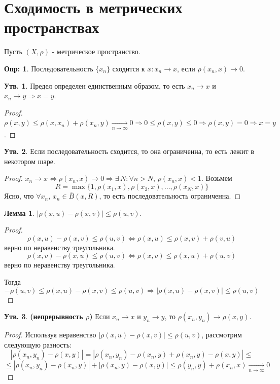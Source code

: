 \documentclass[12pt]{article}
\newcommand{\RN}[1]{%
	\textup{\uppercase\expandafter{\romannumeral#1}}%
}
\theoremstyle{definition}
\newtheorem{defn}{Опр:}
\newtheorem{prop}{Утв.}
\newtheorem{lemma}{Лемма}
\begin{document}
\lhead{Математический анализ - \RN{2}}

\section*{Сходимость в метрических пространствах}
Пусть $(X, \rho)$ - метрическое пространство.
\begin{defn}
	Последовательность $\{x_n\}$ сходится к $x\colon x_n \to x$, если $\rho(x_n,x) \to 0$.
\end{defn}

\begin{prop}
	Предел определен единственным образом, то есть $x_n \to x$ и $x_n \to y \Rightarrow x = y$.
\end{prop}
\begin{proof}
	$\rho(x,y) \leq \rho(x,x_n) + \rho(x_n, y) \xrightarrow[n \to \infty]{} 0  \Rightarrow 0 \leq \rho(x,y) \leq 0 \Rightarrow \rho(x,y) = 0 \Rightarrow x = y$.
\end{proof}

\begin{prop}
	Если последовательность сходится, то она ограниченна, то есть лежит в некотором шаре.
\end{prop}
\begin{proof}
	$x_n \to x \Leftrightarrow \rho(x_n,x) \to 0 \Rightarrow \exists \, N \colon \forall n > N, \, \rho(x_n,x) < 1$. Возьмем 
	$$R = \max\{1, \rho(x_1, x),\rho(x_2,x), \dotsc ,\rho(x_N, x) \}$$
	Ясно, что $\forall x_n, \, x_n \in \overline{B}(x,R)$, то есть последовательность ограниченна.
\end{proof}

\begin{lemma}
	$|\rho(x,u) - \rho(x,v)| \leq \rho(u,v)$.
\end{lemma}
\begin{proof}
	$$\rho(x,u) - \rho(x,v) \leq \rho(u,v) \Leftrightarrow \rho(x,u) \leq \rho(x,v) + \rho(v,u)$$
	верно по неравенству треугольника.
	$$\rho(x,v) - \rho(x,u) \leq \rho(u,v) \Leftrightarrow \rho(x,v) \leq \rho(x,u) + \rho(u,v)$$
	верно по неравенству треугольника.
	
	Тогда $$-\rho(u,v) \leq \rho(x,u) - \rho(x,v) \leq \rho(u,v) \Rightarrow |\rho(x,u) - \rho(x,v)| \leq \rho(u,v)$$
\end{proof}

\begin{prop}\textbf{(непрерывность $\rho$)} 
	Если $x_n \to x$ и $y_n \to y$, то $\rho(x_n, y_n) \to \rho(x,y)$.
\end{prop}
\begin{proof}
	Используя неравенство $|\rho(x,u) - \rho(x,v)| \leq \rho(u,v)$, рассмотрим следующую разность:
	$$
		|\rho(x_n, y_n) - \rho(x,y)| = |\rho(x_n, y_n) - \rho(x_n,y) + \rho(x_n,y) - \rho(x,y)| \leq
	$$
	$$
		\leq  |\rho(x_n, y_n) - \rho(x_n,y)| + |\rho(x_n,y) - \rho(x,y)| \leq \rho(y_n, y) + \rho(x_n,x) \xrightarrow[n \to \infty]{} 0
	$$
\end{proof}
\end{document}
